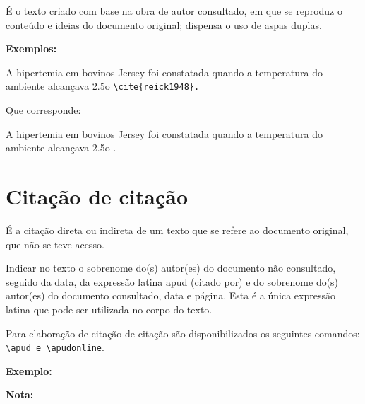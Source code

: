 É o texto criado com base na obra de autor consultado, em que se reproduz o conteúdo e ideias do documento original; dispensa o uso de aspas duplas.

\textbf{Exemplos:}

A hipertemia em bovinos Jersey foi constatada quando a temperatura do ambiente
alcançava 2.5o \verb+\cite{reick1948}.+

Que corresponde:

A hipertemia em bovinos Jersey foi constatada quando a temperatura do ambiente
alcançava 2.5o \cite{reick1948}.


\section{Citação de citação}

É a citação direta ou indireta de um texto que se refere ao documento original, que não se teve acesso.

Indicar no texto o sobrenome do(s) autor(es) do documento não consultado, seguido da data, da expressão latina apud (citado por) e do sobrenome do(s) autor(es) do documento consultado, data e página. Esta é a única expressão latina que pode ser utilizada no corpo do texto.

Para elaboração de citação de citação são disponibilizados os seguintes comandos: \verb+\apud e \apudonline+.

\textbf{Exemplo:}

\textbf{Nota:}

